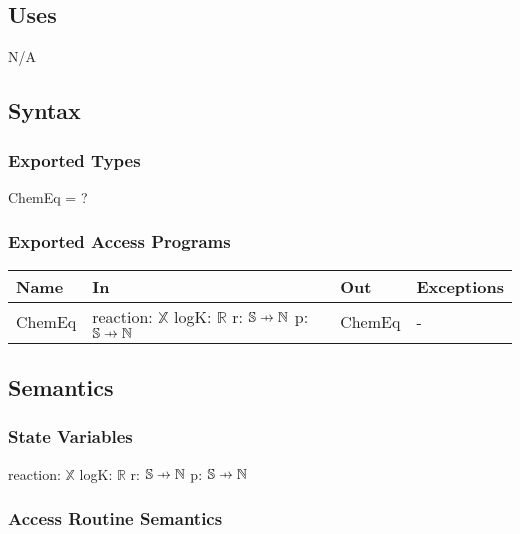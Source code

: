 \documentclass[12pt, titlepage]{article}
\newcommand\pfun{\mathrel{\ooalign{\hfil$\mapstochar\mkern5mu$\hfil\cr$\to$\cr}}}
\begin{document}
\subsection{Uses}

N/A

\subsection{Syntax}

\subsubsection{Exported Types}

ChemEq = ?

\subsubsection{Exported Access Programs}

\begin{center}
\begin{tabular}{p{2cm} p{4cm} p{4cm} p{2cm}}
\hline
\textbf{Name} & \textbf{In} & \textbf{Out} & \textbf{Exceptions} \\
\hline
ChemEq & reaction: $\mathbb{X}$ 
         \newline logK: $\mathbb{R}$
         \newline r: $\mathbb{S} \pfun \mathbb{N}$
         \newline p: $\mathbb{S} \pfun \mathbb{N}$ 
                 & ChemEq & - \\
\hline
\end{tabular}
\end{center}

\subsection{Semantics}

\subsubsection{State Variables}
reaction: $\mathbb{X}$ 
\newline logK: $\mathbb{R}$
\newline r: $\mathbb{S} \pfun \mathbb{N}$
\newline p: $\mathbb{S} \pfun \mathbb{N}$ 


\subsubsection{Access Routine Semantics}
\end{document}
